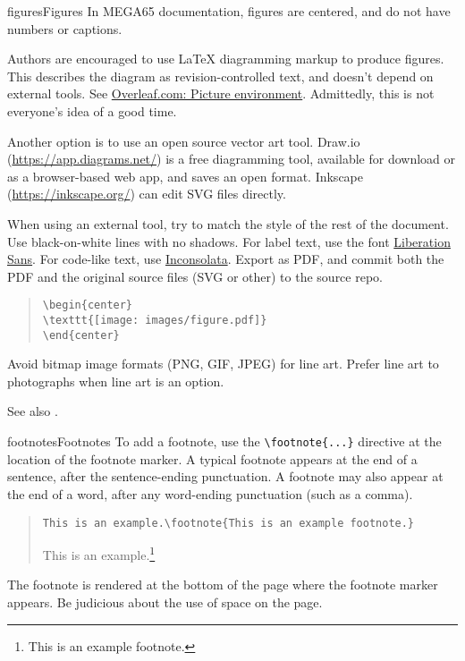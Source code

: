 \begin{sgentry}{figures}{Figures}
    In MEGA65 documentation, figures are centered, and do not have numbers or captions.

    Authors are encouraged to use LaTeX diagramming markup to produce figures. This describes the diagram as revision-controlled text, and doesn't depend on external tools. See \href{https://www.overleaf.com/learn/latex/Picture_environment}{Overleaf.com: Picture environment}. Admittedly, this is not everyone's idea of a good time.

    Another option is to use an open source vector art tool. Draw.io (\url{https://app.diagrams.net/}) is a free diagramming tool, available for download or as a browser-based web app, and saves an open format. Inkscape (\url{https://inkscape.org/}) can edit SVG files directly.

    When using an external tool, try to match the style of the rest of the document. Use black-on-white lines with no shadows. For label text, use the font \href{https://en.wikipedia.org/wiki/Liberation_fonts}{Liberation Sans}. For code-like text, use \href{https://fonts.google.com/specimen/Inconsolata}{Inconsolata}. Export as PDF, and commit both the PDF and the original source files (SVG or other) to the source repo.

    \begin{quote}
\begin{verbatim}
\begin{center}
\texttt{[image: images/figure.pdf]}
\end{center}
\end{verbatim}
    \end{quote}

    Avoid bitmap image formats (PNG, GIF, JPEG) for line art. Prefer line art to photographs when line art is an option.

    See also .
\end{sgentry}

\begin{sgentry}{footnotes}{Footnotes}
    To add a footnote, use the \texttt{{\textbackslash}footnote\{...\}} directive at the location of the footnote marker. A typical footnote appears at the end of a sentence, after the sentence-ending punctuation. A footnote may also appear at the end of a word, after any word-ending punctuation (such as a comma).

    \begin{quote}
        \texttt{This is an example.{\textbackslash}footnote\{This is an example footnote.\}}

        \hrulefill

        This is an example.\footnote{This is an example footnote.}
    \end{quote}

    The footnote is rendered at the bottom of the page where the footnote marker appears. Be judicious about the use of space on the page.
\end{sgentry}

